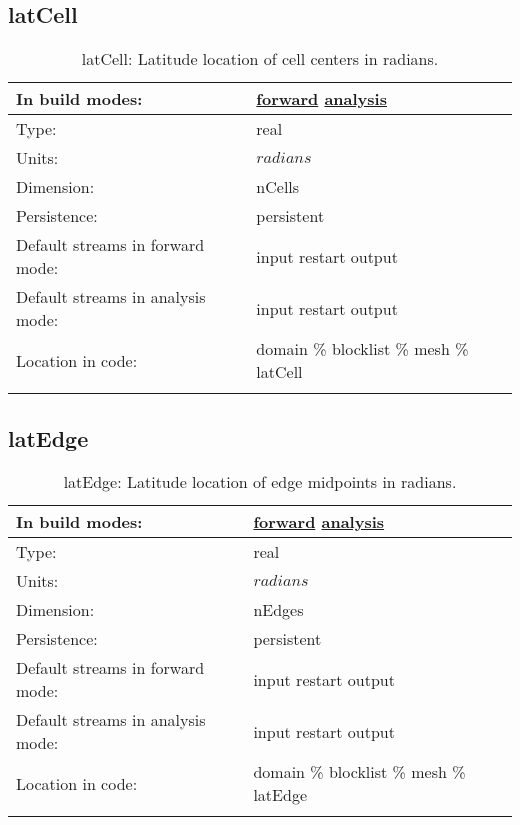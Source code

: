 \subsection[latCell]{latCell}
\label{subsec:var_sec_mesh_latCell}
\begin{center}
\begin{longtable}{| p{2.0in} | p{4.0in} |}
        \hline 
        In build modes: & \hyperref[subsec:forward_var_tab_mesh]{forward} \hyperref[subsec:analysis_var_tab_mesh]{analysis} \\
        \hline 
        Type: & real \\
        \hline 
        Units: & $radians$ \\
        \hline 
        Dimension: & nCells \\
        \hline 
        Persistence: & persistent \\
        \hline 
		 Default streams in forward mode: &  input restart output \\
        \hline 
		 Default streams in analysis mode: &  input restart output \\
        \hline 
		 Location in code: & domain \% blocklist \% mesh \% latCell \\
		 \hline 
    \caption{latCell: Latitude location of cell centers in radians.}
\end{longtable}
\end{center}
\subsection[latEdge]{latEdge}
\label{subsec:var_sec_mesh_latEdge}
\begin{center}
\begin{longtable}{| p{2.0in} | p{4.0in} |}
        \hline 
        In build modes: & \hyperref[subsec:forward_var_tab_mesh]{forward} \hyperref[subsec:analysis_var_tab_mesh]{analysis} \\
        \hline 
        Type: & real \\
        \hline 
        Units: & $radians$ \\
        \hline 
        Dimension: & nEdges \\
        \hline 
        Persistence: & persistent \\
        \hline 
		 Default streams in forward mode: &  input restart output \\
        \hline 
		 Default streams in analysis mode: &  input restart output \\
        \hline 
		 Location in code: & domain \% blocklist \% mesh \% latEdge \\
		 \hline 
    \caption{latEdge: Latitude location of edge midpoints in radians.}
\end{longtable}
\end{center}
